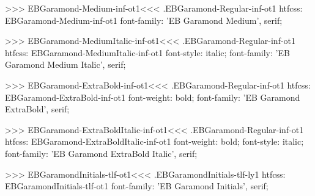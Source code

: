 {{>>>
\<EBGaramond-Medium-inf-ot1\><<<
.EBGaramond-Regular-inf-ot1
htfcss:  EBGaramond-Medium-inf-ot1  font-family: 'EB Garamond Medium', serif;

>>>
\<EBGaramond-MediumItalic-inf-ot1\><<<
.EBGaramond-Regular-inf-ot1
htfcss:  EBGaramond-MediumItalic-inf-ot1  font-style: italic; font-family: 'EB Garamond Medium Italic', serif;

>>>
\<EBGaramond-ExtraBold-inf-ot1\><<<
.EBGaramond-Regular-inf-ot1
htfcss:  EBGaramond-ExtraBold-inf-ot1  font-weight: bold; font-family: 'EB Garamond ExtraBold', serif;

>>>
\<EBGaramond-ExtraBoldItalic-inf-ot1\><<<
.EBGaramond-Regular-inf-ot1
htfcss:  EBGaramond-ExtraBoldItalic-inf-ot1  font-weight: bold; font-style: italic; font-family: 'EB Garamond ExtraBold Italic', serif;

>>>
\<EBGaramondInitials-tlf-ot1\><<<
.EBGaramondInitials-tlf-ly1
htfcss:  EBGaramondInitials-tlf-ot1  font-family: 'EB Garamond Initials', serif;

}}
